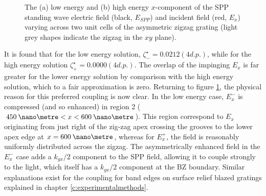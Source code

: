\begin{figure}
\begin{center}
\end{center}
\caption[The low energy and high energy $x$-component of the SPP standing wave electric field and the incident field across two unit cells of the asymmetric zigzag grating.]{The (a) low energy and (b) high energy $x$-component of the SPP standing wave electric field (black, $E_{SPP}$) and incident field (\color{red}red\color{black}, $E_x$) varying across two unit cells of the asymmetric zigzag grating (light grey shapes indicate the zigzag in the $xy$ plane).\label{fig:asm-overlaps}}
\end{figure}

It is found that for the low energy solution, $\zeta^\star_-=0.0212 (4 d.p.)$, while for the high energy solution $\zeta^\star_+=0.0000 (4 d.p.)$. The overlap of the impinging $E_x$ is far greater for the lower energy solution by comparison with the high energy solution, which to a fair approximation is zero.  Returning to figure \ref{fig:asm-overlaps}, the physical reason for this preferred coupling is now clear. In the low energy case, $E_x^-$ is compressed (and so enhanced) in region 2 ($450\:\nano\metre < x <600\:\nano\metre$). This region correspond to $E_x$ originating from just right of the zig-zag apex crossing the grooves to the lower apex edge at $x=600\:\nano\metre$, whereas for $E_x^+$, the field is reasonably uniformly distributed across the zigzag. The asymmetrically enhanced field in the $E_x^-$ case adds a $k_{gx}/2$ component to the SPP field, allowing it to couple strongly to the light, which itself has a $k_{gx}/2$ component at the BZ boundary. Similar explanations exist for the coupling for band edges on surface relief blazed gratings \cite{Barnes1996,Kitson1996} explained in chapter \ref{c:experimentalmethods}.
 
